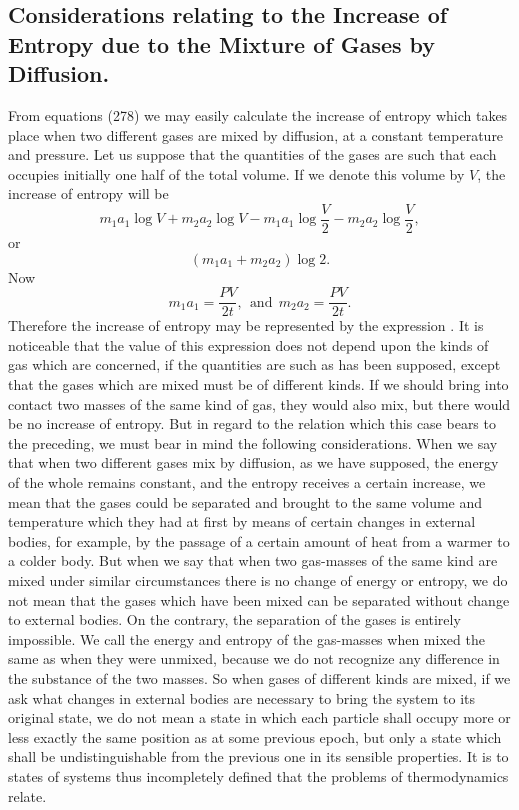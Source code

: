 \documentclass[12pt]{article}
\begin{document}
\subsection{Considerations relating to the Increase of Entropy due to the
Mixture of Gases by Diffusion.}

From  equations (278) we may easily calculate the increase of entropy which takes place when two different gases are mixed by diffusion, at a constant temperature and pressure. Let us suppose that the quantities of the gases are such that each occupies initially one half of the total volume. If we denote this volume by $V$, the increase of entropy will be
 $$m_1 a_1 \log V+ m_2 a_2 \log V- m_1 a_1 \log \frac{V}{2} - m_2 a_2 \log \frac{V}{2},$$
or                   $$ (m_1 a_1 +m_2 a_2) \log 2.$$
Now               
$$m_1 a_1=\frac{PV}{2t}, \ \ \text{and} \ \  m_2 a_2=\frac{PV}{2t}.$$
Therefore the increase of entropy may be represented by the expression
\eqs {}  .       \label{297}\eqe
It is noticeable that the value of this expression does not depend upon the kinds of gas which are concerned, if the quantities are such as has been supposed, except that the gases which are mixed must be of different kinds. If we should bring into contact two masses of the same kind of gas, they would also mix, but there would be no increase of entropy. But in regard to the relation which this case bears to the preceding, we must bear in mind the following considerations. When we say that when two different gases mix by diffusion, as we have supposed, the energy of the whole remains constant, and the entropy receives a certain increase, we mean that the gases could be separated and brought to the same volume and temperature which they had at first by means of certain changes in external bodies, for example, by the passage of a certain amount of heat from a warmer to a colder body. But when we say that when two gas-masses of the same kind are mixed under similar circumstances there is no change of energy or entropy, we do not mean that the gases which have been mixed can be separated without change to external bodies. On the contrary, the separation of the gases is entirely impossible. We call the energy and entropy of the gas-masses when mixed the same as when they were unmixed, because we do not recognize any difference in the substance of the two masses. So when gases of different kinds are mixed, if we ask what changes in external bodies are necessary to bring the system to its original state, we do not mean a state in which each particle shall occupy more or less exactly the same position as at some previous epoch, but only a state which shall be undistinguishable from the previous one in its sensible properties. It is to states of systems thus incompletely defined that the problems of thermodynamics relate.
\end{document}
